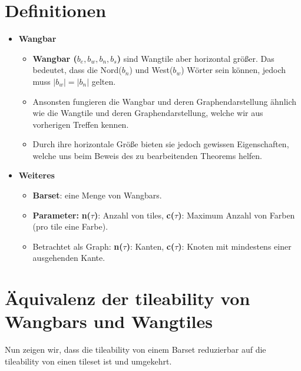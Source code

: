 \section{Definitionen}
\begin{itemize}
    \item \textbf{Wangbar}
    \begin{itemize}
        \item \textbf{Wangbar ($b_e,b_w,b_n,b_s$)} sind Wangtile aber horizontal größer. Das bedeutet, dass die Nord($b_n$) und West($b_w$) Wörter  sein können, jedoch muss $|b_w| =  |b_n|$ gelten.
        \item Ansonsten fungieren die Wangbar und deren Graphendarstellung ähnlich wie die Wangtile und deren Graphendarstellung, welche wir aus vorherigen Treffen kennen.
        \item Durch ihre horizontale Größe bieten sie jedoch gewissen Eigenschaften, welche uns beim Beweis des zu bearbeitenden Theorems helfen.
    \end{itemize}
    
    \item \textbf{Weiteres}
    \begin{itemize}
        \item \textbf{Barset}: eine Menge von Wangbars.
        \item \textbf{Parameter:} \textbf{n($\tau$)}: Anzahl von tiles, \textbf{c($\tau$)}: Maximum Anzahl von Farben (pro tile eine Farbe). %
        \item Betrachtet als Graph: \textbf{n($\tau$)}: Kanten, \textbf{c($\tau$)}: Knoten mit mindestens einer ausgehenden Kante.
    \end{itemize}
    
\end{itemize}





\section{Äquivalenz der tileability von Wangbars und Wangtiles}
Nun zeigen wir, dass die tileability von einem Barset reduzierbar auf die tileability von einen tileset ist und umgekehrt.


